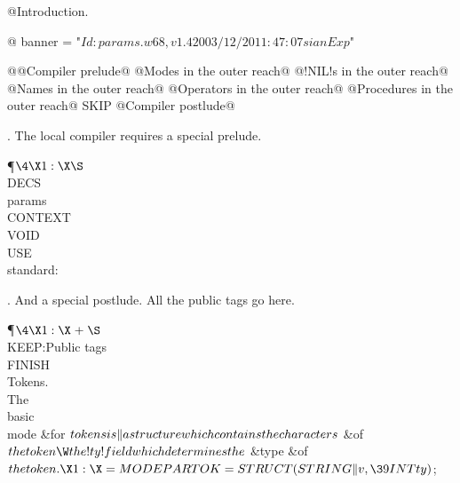 
\def\Algol{\textbf{Algol 68}}
\def\Web{\textbf{Web68}}

@Introduction.

@ banner = "$Id: params.w68,v 1.4 2003/12/20 11:47:07 sian Exp $"

@@Compiler prelude@
@Modes in the outer reach@
@!NIL!s in the outer reach@
@Names in the outer reach@
@Operators in the outer reach@
@Procedures in the outer reach@
SKIP
@Compiler postlude@


. The local compiler requires a special prelude.

\Y\P$\4\X1:\X\S$\6
\4\\{DECS}\\{params}\\{CONTEXT}\\{VOID}\\{USE}\\{standard}: \par
\fi

. And a special postlude. All the public tags go here.

\Y\P$\4\X1:\X\mathrel{+}\S$\6
\\{KEEP}:Public tags\X\\{FINISH}\\{Tokens}.\\{The}\\{basic}\\{mode} \6
\&{for} $\\{tokens}\\{is}\|a\\{structure}\\{which}\\{contains}\\{the}%
\\{characters}$ \1\&{of} $\\{the}\\{token}\W\\{the}!\\{ty}!\\{field}\\{which}%
\\{determines}\\{the}$ \6
\4\&{type} \&{of} $\\{the}\\{token}.\X1:\X=\\{MODE}\\{PARTOK}=\\{STRUCT}(%
\\{STRING}\|v,\39\\{INT}\\{ty})$;\par
\fi

